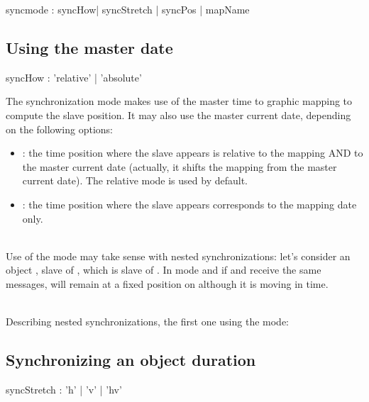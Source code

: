 \documentclass[a4paper,twoside]{report}
\newcommand{\subsublevel}[1]	{\subsection{#1}}
\begin{document}

\begin{rail}
syncmode : syncHow| syncStretch | syncPos | mapName
\end{rail}

\subsublevel{Using the master date}
\label{syncmaster}


\begin{rail}
syncHow : 'relative' | 'absolute'
\end{rail}

The synchronization mode makes use of the master time to graphic mapping to compute the slave position. It may also use the master current date, depending on the following options:
\begin{itemize}
\item {}: the time position where the slave appears is relative to the mapping AND to the master current date (actually, it shifts the mapping from the master current date). The relative mode is used by default.
\item {}: the time position where the slave appears corresponds to the mapping date only.
\end{itemize}

\note{} \\
Use of the  mode may take sense with nested synchronizations: let's consider an object , slave of , which is slave of .
In  mode and if  and  receive the same  messages,  will remain at a fixed position on  although it is moving in time.

\example \\
Describing nested synchronizations, the first one using the  mode:

\subsublevel{Synchronizing an object duration}
\label{syncduration}


\begin{rail}
syncStretch : 'h' | 'v' | 'hv'
\end{rail}
\end{document}
